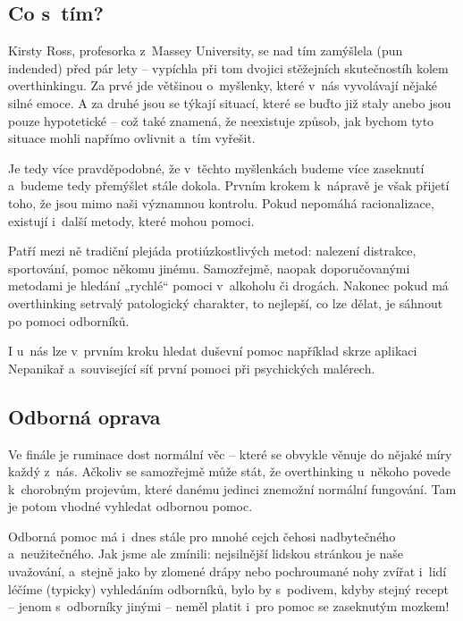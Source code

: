 \documentclass[main.tex]{subfiles}
\begin{document}
\subsection*{Co s~tím?}
Kirsty Ross, profesorka z~Massey University, se nad tím zamýšlela (pun indended) před pár lety – vypíchla při tom dvojici stěžejních skutečnostíh kolem overthinkingu. Za prvé jde většinou o~myšlenky, které v~nás vyvolávají nějaké silné emoce. A za druhé jsou se týkají situací, které se buďto již staly anebo jsou pouze hypotetické – což také znamená, že neexistuje způsob, jak bychom tyto situace mohli napřímo ovlivnit a~tím vyřešit.\par
Je tedy více pravděpodobné, že v~těchto myšlenkách budeme více zaseknutí a~budeme tedy přemýšlet stále dokola. Prvním krokem k~nápravě je však přijetí toho, že jsou mimo naši významnou kontrolu. Pokud nepomáhá racionalizace, existují i~další metody, které mohou pomoci.\par
Patří mezi ně tradiční plejáda protiúzkostlivých metod: nalezení distrakce, sportování, pomoc někomu jinému. Samozřejmě, naopak doporučovanými metodami je hledání „rychlé“ pomoci v~alkoholu či drogách. Nakonec pokud má overthinking setrvalý patologický charakter, to nejlepší, co lze dělat, je sáhnout po pomoci odborníků.\par
I u~nás lze v~prvním kroku hledat duševní pomoc například skrze aplikaci Nepanikař a~související síť první pomoci při psychických malérech.
\subsection*{Odborná oprava}
Ve finále je ruminace dost normální věc – které se obvykle věnuje do nějaké míry každý z~nás. Ačkoliv se samozřejmě může stát, že overthinking u~někoho povede k~chorobným projevům, které danému jedinci znemožní normální fungování. Tam je potom vhodné vyhledat odbornou pomoc.\par
Odborná pomoc má i~dnes stále pro mnohé cejch čehosi nadbytečného a~neužitečného. Jak jsme ale zmínili: nejsilnější lidskou stránkou je naše uvažování, a~stejně jako by zlomené drápy nebo pochroumané nohy zvířat i~lidí léčíme (typicky) vyhledáním odborníků, bylo by s~podivem, kdyby stejný recept – jenom s~odborníky jinými – neměl platit i~pro pomoc se zaseknutým mozkem!
\newpage
\end{document}
